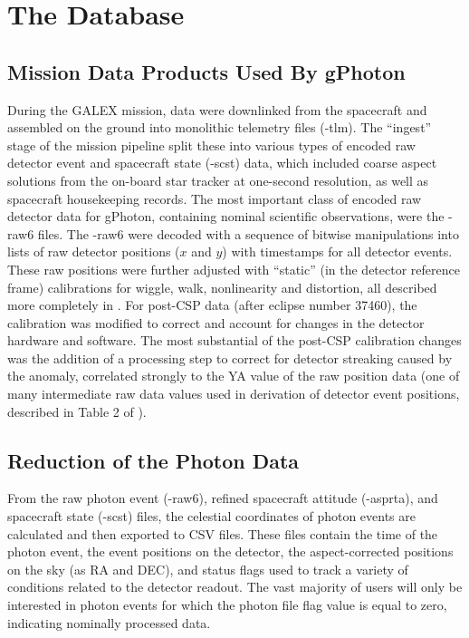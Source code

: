 \documentclass[preprint]{aastex}
\begin{document}
\section{The Database}
\label{database}
\subsection{Mission Data Products Used By gPhoton}
During the GALEX mission, data were downlinked from the spacecraft and assembled on the ground into monolithic telemetry files (-tlm). The ``ingest'' stage of the mission pipeline split these into various types of encoded raw detector event and spacecraft state (-scst) data, which included coarse aspect solutions from the on-board star tracker at one-second resolution, as well as spacecraft housekeeping records. The most important class of encoded raw detector data for gPhoton, containing nominal scientific observations, were the -raw6 files. The -raw6 were decoded with a sequence of bitwise manipulations into lists of raw detector positions ($x$ and $y$) with timestamps for all detector events. These raw positions were further adjusted with ``static'' (in the detector reference frame) calibrations for wiggle, walk, nonlinearity and distortion, all described more completely in \citet{mor2007}. For post-CSP data (after eclipse number 37460), the calibration was modified to correct and account for changes in the detector hardware and software. The most substantial of the post-CSP calibration changes was the addition of a processing step to correct for detector streaking caused by the anomaly, correlated strongly to the YA value of the raw position data (one of many intermediate raw data values used in derivation of detector event positions, described in Table 2 of \cite{mor2007}).

\subsection{Reduction of the Photon Data}
From the raw photon event (-raw6), refined spacecraft attitude (-asprta), and spacecraft state (-scst) files, the celestial coordinates of photon events are calculated and then exported to CSV files. These files contain the time of the photon event, the event positions on the detector, the aspect-corrected positions on the sky (as RA and DEC), and status flags used to track a variety of conditions related to the detector readout. The vast majority of users will only be interested in photon events for which the photon file flag value is equal to zero, indicating nominally processed data.
\end{document}
